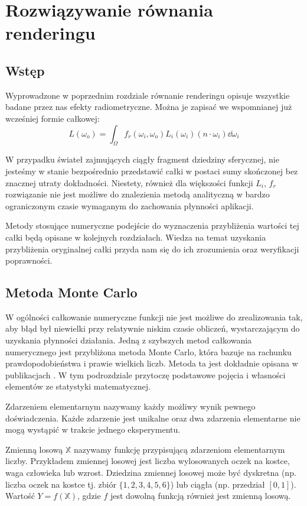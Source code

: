 \documentclass[../main.tex]{subfiles}
\begin{document}
\chapter{Rozwiązywanie równania renderingu}

\section{Wstęp}

Wyprowadzone w poprzednim rozdziale równanie renderingu opisuje wszystkie badane przez nas efekty radiometryczne. Można je zapisać we wspomnianej już wcześniej formie całkowej:
\[
  L(\omega_o) = \int_{\Omega} {
      f_r(\omega_i, \omega_o)
      L_i(\omega_i)
      (n \cdot \omega_i)
      \dd{\omega_i}
  }
\]

W przypadku świateł zajmujących ciągły fragment dziedziny sferycznej, nie jesteśmy w stanie bezpośrednio przedstawić całki w postaci sumy skończonej bez znacznej utraty dokładności. Niestety, również dla większości funkcji $L_i$, $f_r$ rozwiązanie nie jest możliwe do znalezienia metodą analityczną w bardzo ograniczonym czasie wymaganym do zachowania płynności aplikacji.

Metody stosujące numeryczne podejście do wyznaczenia przybliżenia wartości tej całki będą opisane w kolejnych rozdziałach. Wiedza na temat uzyskania przybliżenia oryginalnej całki przyda nam się do ich zrozumienia oraz weryfikacji poprawności.

\section{Metoda Monte Carlo}

W ogólności całkowanie numeryczne funkcji nie jest możliwe do zrealizowania tak, aby błąd był niewielki przy relatywnie niskim czasie obliczeń, wystarczającym do uzyskania płynności działania. Jedną z szybszych metod całkowania numerycznego jest przybliżona metoda Monte Carlo, która bazuje na rachunku prawdopodobieństwa i prawie wielkich liczb. Metoda ta jest dokładnie opisana w publikacjach \cite{Sierocinski,MonteCarloAnderson,Veach}. W tym podrozdziale przytoczę podstawowe pojęcia i własności elementów ze statystyki matematycznej.

Zdarzeniem elementarnym nazywamy każdy możliwy wynik pewnego doświadczenia. Każde zdarzenie jest unikalne oraz dwa zdarzenia elementarne nie mogą wystąpić w trakcie jednego eksperymentu.

Zmienną losową $\mathbb{X}$ nazywamy funkcję przypisującą zdarzeniom elementarnym liczby. Przykładem zmiennej losowej jest liczba wylosowanych oczek na kostce, waga człowieka lub wzrost. Dziedzina zmiennej losowej może być dyskretna (np. liczba oczek na kostce tj. zbiór $\{1,2,3,4,5,6\}$) lub ciągła (np. przedział $[0,1]$). Wartość $Y = f(\mathbb{X})$, gdzie $f$ jest dowolną funkcją również jest zmienną losową. 
\end{document}
